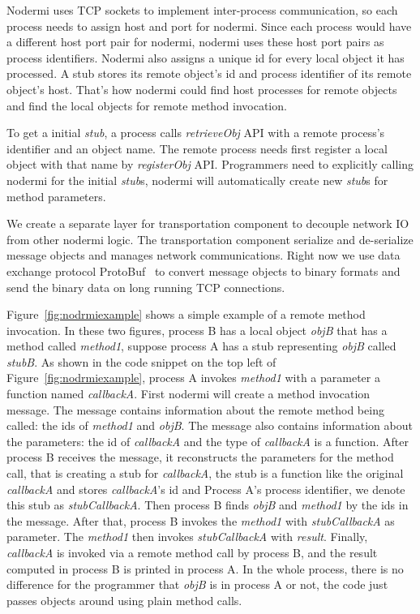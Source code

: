 Nodermi uses TCP sockets to implement inter-process communication,
so each process needs to assign host and port for nodermi.
Since each process would have a different host port pair for nodermi,
nodermi uses these host port pairs as process identifiers.
Nodermi also assigns a unique id for every local object it has processed.
A stub stores its remote object's id and process identifier of its remote object's host.
That's how nodermi could find host processes for remote objects and
find the local objects for remote method invocation.

To get a initial \emph{stub}, a process 
calls \emph{retrieveObj} API with a remote process's identifier and 
an object name.
The remote process needs first register a local object with that name by
\emph{registerObj} API.
Programmers need to explicitly calling nodermi for the initial \emph{stub}s,
nodermi will automatically create new \emph{stub}s for method parameters.


We create a separate layer for transportation component to decouple network
IO from other nodermi logic.
The transportation component serialize and de-serialize message objects
and manages network communications.
Right now we use data exchange protocol ProtoBuf~\cite{protobuf} to convert message objects to binary
formats and send the binary data on long running TCP connections.



\nodrmiexamplefig{}

Figure~\ref{fig:nodrmiexample} shows a simple example
of a remote method invocation.
In these two figures, process B has a local object \emph{objB} that has a method called \emph{method1},
suppose process A has a stub representing \emph{objB} called \emph{stubB}.
As shown in the code snippet on the top left of Figure~\ref{fig:nodrmiexample},
process A invokes \emph{method1} with a parameter a function named \emph{callbackA}.
First nodermi will create a method invocation message.
The message contains information about the remote method being called:
the ids of \emph{method1} and \emph{objB}.
The message also contains information about the parameters:
the id of \emph{callbackA} and the type of \emph{callbackA} is a function.
After process B receives the message,
it reconstructs the parameters for the method call,
that is creating a stub for \emph{callbackA},
the stub is a function like the original \emph{callbackA} and 
stores \emph{callbackA}'s id and Process A's process identifier,
we denote this stub as \emph{stubCallbackA}.
Then process B finds \emph{objB} and \emph{method1} by the ids in the message.
After that,
process B invokes the \emph{method1} with \emph{stubCallbackA} as parameter.
The \emph{method1} then invokes \emph{stubCallbackA} with \emph{result}.
Finally, \emph{callbackA} is invoked
via a remote method call by process B,
and the result computed in process B is printed in process A.
In the whole process, there is no difference for the programmer that \emph{objB}
is in process A or not, the code just passes objects around using plain method calls.


